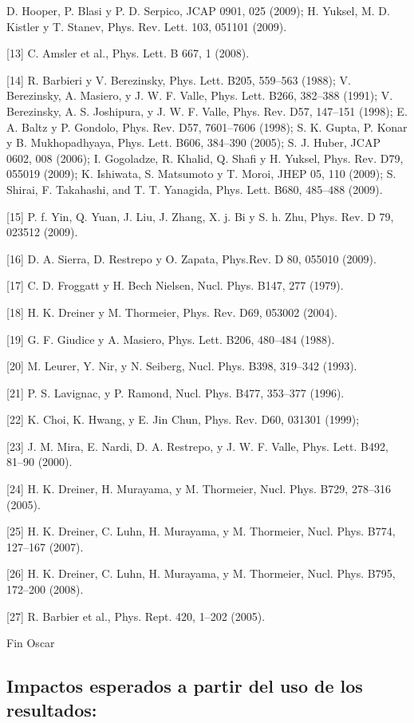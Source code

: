 \begin{ideas}
[12] D. Hooper, P. Blasi y P. D. Serpico, JCAP 0901, 025 (2009); H. Yuksel, M. D. Kistler y T. Stanev,
 Phys. Rev. Lett. 103, 051101 (2009).

[13] C. Amsler et al., Phys. Lett. B 667, 1 (2008).

[14] R. Barbieri y V. Berezinsky, Phys. Lett. B205, 559–563 (1988); V. Berezinsky, A. Masiero, y J. W. F. Valle, 
Phys. Lett. B266, 382–388 (1991); V. Berezinsky, A. S. Joshipura, y J. W. F. Valle, Phys. Rev. D57, 147–151 (1998); 
E. A. Baltz y P. Gondolo, Phys. Rev. D57, 7601–7606 (1998);  S. K. Gupta, P. Konar y B. Mukhopadhyaya, 
Phys. Lett. B606, 384–390 (2005); S. J. Huber, JCAP 0602, 008 (2006); I. Gogoladze, R. Khalid, Q. Shafi y H. Yuksel, 
Phys. Rev. D79, 055019 (2009); K. Ishiwata, S. Matsumoto y T. Moroi, JHEP 05, 110 (2009); S. Shirai, F. Takahashi, 
and T. T. Yanagida, Phys. Lett. B680, 485–488 (2009).

[15] P. f. Yin, Q. Yuan, J. Liu, J. Zhang, X. j. Bi y S. h. Zhu, Phys. Rev. D 79, 023512 (2009).

[16] D. A. Sierra, D. Restrepo y O. Zapata, Phys.Rev. D 80, 055010 (2009).

[17] C. D. Froggatt y H. Bech Nielsen, Nucl. Phys. B147, 277 (1979).

[18] H. K. Dreiner y M. Thormeier, Phys. Rev. D69, 053002 (2004).

[19] G. F. Giudice y A. Masiero, Phys. Lett. B206, 480–484 (1988).

[20] M. Leurer, Y. Nir, y N. Seiberg, Nucl. Phys. B398, 319–342 (1993).

[21] P. S. Lavignac, y P. Ramond, Nucl. Phys. B477, 353–377 (1996).

[22] K. Choi, K. Hwang, y E. Jin Chun, Phys. Rev. D60, 031301 (1999);

[23] J. M. Mira, E. Nardi, D. A. Restrepo, y J. W. F. Valle, Phys. Lett. B492, 81–90 (2000).

[24] H. K. Dreiner, H. Murayama, y M. Thormeier, Nucl. Phys. B729, 278–316 (2005).

[25] H. K. Dreiner, C. Luhn, H. Murayama, y M. Thormeier, Nucl. Phys. B774, 127–167 (2007).

[26] H. K. Dreiner, C. Luhn, H. Murayama, y M. Thormeier, Nucl. Phys. B795, 172–200 (2008).

[27] R. Barbier et al., Phys. Rept. 420, 1–202 (2005). 

Fin Oscar

\subsection{Impactos esperados a partir del uso de los resultados:}


\end{ideas}
